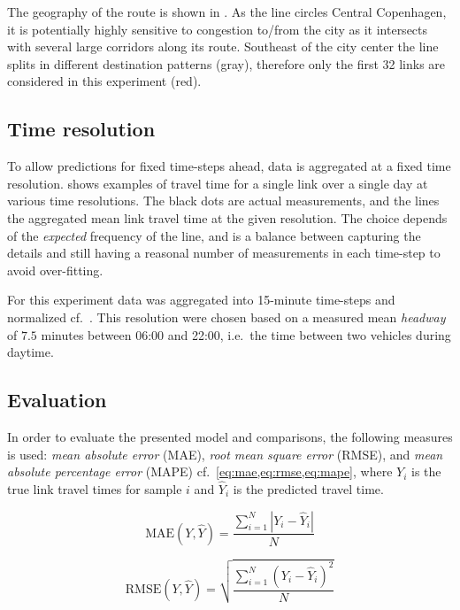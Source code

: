 \documentclass[preprint,11pt,5p,twocolumn]{elsarticle}
\begin{document}
The geography of the route is shown in . As the line circles Central Copenhagen, it is potentially highly sensitive to congestion to/from the city as it intersects with several large corridors along its route. Southeast of the city center the line splits in different destination patterns (gray), therefore only the first 32 links are considered in this experiment (red).

\subsection{Time resolution}
To allow predictions for fixed time-steps ahead, data is aggregated at a fixed time resolution.  shows examples of travel time for a single link over a single day at various time resolutions. The black dots are actual measurements, and the lines the aggregated mean link travel time at the given resolution. The choice depends of the \emph{expected} frequency of the line, and is a balance between capturing the details and still having a reasonal number of measurements in each time-step to avoid over-fitting.

For this experiment data was aggregated into 15-minute time-steps and normalized cf.~. This resolution were chosen based on a measured mean \emph{headway} of $7.5$ minutes between 06:00 and 22:00, i.e.\ the time between two vehicles during daytime.







\subsection{Evaluation}
In order to evaluate the presented model and comparisons, the following measures is used: \emph{mean absolute error} (MAE), \emph{root mean square error} (RMSE), and \emph{mean absolute percentage error} (MAPE) cf.~\cref{eq:mae,eq:rmse,eq:mape}, where $Y_i$ is the true link travel times for sample $i$ and $\widehat{Y}_i$ is the predicted travel time.

\begin{equation}
    \textrm{MAE}(Y, \widehat{Y}) = \frac{\sum_{i = 1}^{N} \left| Y_i - \widehat{Y}_i \right| }{N}
    \label{eq:mae}
\end{equation}

\begin{equation}
    \textrm{RMSE}(Y, \widehat{Y}) = \sqrt{\frac{\sum_{i = 1}^{N} \left(Y_i - \widehat{Y}_i \right)^2}{N}}
    \label{eq:rmse}
\end{equation}
\end{document}
